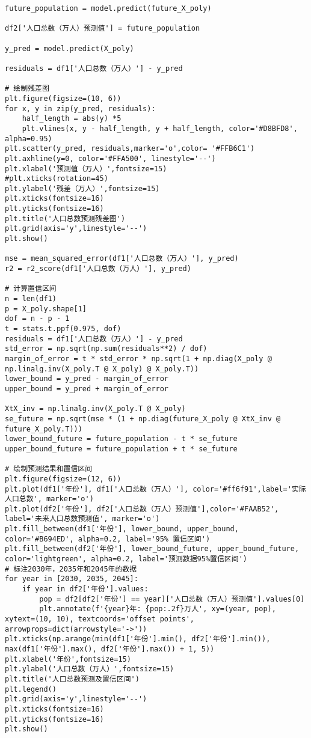 \documentclass[withoutpreface,bwprint]{cumcmthesis} %
\begin{document}
\begin{verbatim}
future_population = model.predict(future_X_poly)

df2['人口总数（万人）预测值'] = future_population

y_pred = model.predict(X_poly)

residuals = df1['人口总数（万人）'] - y_pred

# 绘制残差图
plt.figure(figsize=(10, 6))
for x, y in zip(y_pred, residuals):
    half_length = abs(y) *5
    plt.vlines(x, y - half_length, y + half_length, color='#D8BFD8', alpha=0.95)
plt.scatter(y_pred, residuals,marker='o',color= '#FFB6C1')
plt.axhline(y=0, color='#FFA500', linestyle='--')
plt.xlabel('预测值（万人）',fontsize=15)
#plt.xticks(rotation=45)
plt.ylabel('残差（万人）',fontsize=15)
plt.xticks(fontsize=16)
plt.yticks(fontsize=16)
plt.title('人口总数预测残差图')
plt.grid(axis='y',linestyle='--')
plt.show()

mse = mean_squared_error(df1['人口总数（万人）'], y_pred)
r2 = r2_score(df1['人口总数（万人）'], y_pred)

# 计算置信区间
n = len(df1)
p = X_poly.shape[1]
dof = n - p - 1
t = stats.t.ppf(0.975, dof)
residuals = df1['人口总数（万人）'] - y_pred
std_error = np.sqrt(np.sum(residuals**2) / dof)
margin_of_error = t * std_error * np.sqrt(1 + np.diag(X_poly @ np.linalg.inv(X_poly.T @ X_poly) @ X_poly.T))
lower_bound = y_pred - margin_of_error
upper_bound = y_pred + margin_of_error

XtX_inv = np.linalg.inv(X_poly.T @ X_poly)
se_future = np.sqrt(mse * (1 + np.diag(future_X_poly @ XtX_inv @ future_X_poly.T)))
lower_bound_future = future_population - t * se_future
upper_bound_future = future_population + t * se_future

# 绘制预测结果和置信区间
plt.figure(figsize=(12, 6))
plt.plot(df1['年份'], df1['人口总数（万人）'], color='#ff6f91',label='实际人口总数', marker='o')
plt.plot(df2['年份'], df2['人口总数（万人）预测值'],color='#FAAB52', label='未来人口总数预测值', marker='o')
plt.fill_between(df1['年份'], lower_bound, upper_bound, color='#B694ED', alpha=0.2, label='95% 置信区间')
plt.fill_between(df2['年份'], lower_bound_future, upper_bound_future, color='lightgreen', alpha=0.2, label='预测数据95%置信区间')
# 标注2030年，2035年和2045年的数据
for year in [2030, 2035, 2045]:
    if year in df2['年份'].values:
        pop = df2[df2['年份'] == year]['人口总数（万人）预测值'].values[0]
        plt.annotate(f'{year}年: {pop:.2f}万人', xy=(year, pop), xytext=(10, 10), textcoords='offset points', arrowprops=dict(arrowstyle='->'))
plt.xticks(np.arange(min(df1['年份'].min(), df2['年份'].min()), max(df1['年份'].max(), df2['年份'].max()) + 1, 5))
plt.xlabel('年份',fontsize=15)
plt.ylabel('人口总数（万人）',fontsize=15)
plt.title('人口总数预测及置信区间')
plt.legend()
plt.grid(axis='y',linestyle='--')
plt.xticks(fontsize=16)
plt.yticks(fontsize=16)
plt.show()


\end{verbatim}
\end{document}

